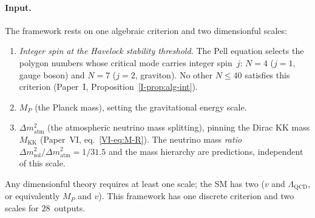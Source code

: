 \paragraph{Input.}
The framework rests on one algebraic criterion and two
dimensionful scales:
\begin{enumerate}
\item[\textbf{A1.}] \emph{Integer spin at the Havelock
  stability threshold.}
  The Pell equation selects the polygon numbers whose
  critical mode carries integer spin~$j$:
  $N = 4$ ($j = 1$, gauge boson) and $N = 7$ ($j = 2$, graviton).
  No other $N \le 40$ satisfies this criterion
  (Paper~I, Proposition~\ref*{I-prop:alg-int}).
\item[\textbf{Scale~1.}] $M_P$ (the Planck mass),
  setting the gravitational energy scale.
\item[\textbf{Scale~2.}] $\Delta m^2_{\mathrm{atm}}$
  (the atmospheric neutrino mass splitting),
  pinning the Dirac KK mass $M_{\mathrm{KK}}$
  (Paper~VI, eq.~\eqref{VI-eq:M-R}).
  The neutrino mass \emph{ratio}
  $\Delta m^2_{\mathrm{sol}}/\Delta m^2_{\mathrm{atm}}
  = 1/31.5$ and the mass hierarchy are predictions,
  independent of this scale.
\end{enumerate}
Any dimensionful theory requires at least one scale;
the SM has two ($v$ and $\Lambda_{\mathrm{QCD}}$,
or equivalently $M_P$ and $v$).
This framework has one discrete criterion and two
scales for $28$~outputs.

